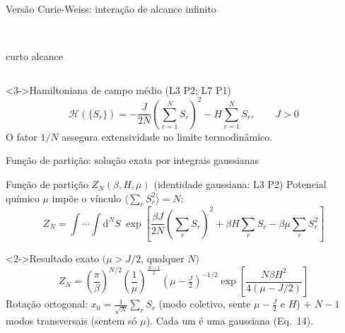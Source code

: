 \documentclass[10pt,aspectratio=169]{beamer}
\newcommand{\lista}[1]{\textcolor{qcdGreen!70!black}{\small(#1)}}
\newcommand{\eq}[1]{\textcolor{qcdBlue!70!black}{\small(#1)}}
\begin{document}
\begin{frame}{Versão Curie-Weiss: interação de alcance infinito}
  \begin{columns}[c]
    \\[1mm]{\small curto alcance}
  \end{columns}
  \bigskip
  \begin{block}<3->{Hamiltoniana de campo médio \lista{L3 P2; L7 P1}}
    \[
      \mathcal{H}(\{S_r\}) =
        -\frac{J}{2N}\!\left(\sum_{r=1}^N S_r\right)^{\!2}
        - H\sum_{r=1}^N S_r, \qquad J>0
    \]
    O fator $1/N$ assegura extensividade no limite termodinâmico.
  \end{block}
\end{frame}

\begin{frame}{Função de partição: solução exata por integrais gaussianas}
  \begin{block}{Função de partição $Z_N(\beta,H,\mu)$ \lista{identidade gaussiana: L3 P2}}
    Potencial químico $\mu$ impõe o vínculo $\langle\sum_r S_r^2\rangle=N$:
    \[
      Z_N = \!\int\!\!\cdots\!\!\int \mathrm{d}^N\!S\;
        \exp\!\left[\frac{\beta J}{2N}\!\left(\sum_r S_r\right)^{\!2}
        +\beta H\!\sum_r S_r - \beta\mu\!\sum_r S_r^2\right]
    \]
  \end{block}
  \begin{block}<2->{Resultado exato $(\mu>J/2$, qualquer $N)$}
    \[
      Z_N = \left(\frac{\pi}{\beta}\right)^{\!N/2}
        \left(\frac{1}{\mu}\right)^{\!\frac{N-1}{2}}
        \!\!\left(\mu-\tfrac{J}{2}\right)^{-1/2}
        \exp\!\left[\frac{N\beta H^2}{4(\mu-J/2)}\right]
    \]
    Rotação ortogonal: $x_0=\frac1{\sqrt N}\sum_rS_r$ (modo coletivo, sente $\mu-\frac J2$ e $H$)
    $+$ $N-1$ modos transversais (sentem só $\mu$). Cada um é uma gaussiana \eq{Eq.~14}.
  \end{block}
\end{frame}
\end{document}
